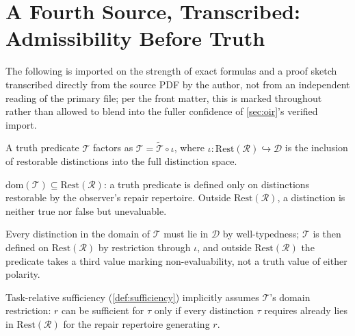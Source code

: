 \section{A Fourth Source, Transcribed: Admissibility Before Truth}
\label{sec:abt}


The following is imported on the strength of exact formulas and a proof
sketch transcribed directly from the source PDF by the author, not from
an independent reading of the primary file; per the front matter, this is
marked throughout rather than allowed to blend into the fuller confidence
of \cref{sec:oir}'s verified import.

\begin{definition}
\label{def:domain-restriction}
A truth predicate $\mathcal{T}$ factors as $\mathcal{T} = \widetilde{\mathcal{T}}
\circ \iota$, where $\iota: \mathrm{Rest}(\mathcal{R}) \hookrightarrow
\mathcal{D}$ is the inclusion of restorable distinctions into the full
distinction space.
\end{definition}

\begin{theorem}
\label{thm:domain-restriction}
$\mathrm{dom}(\mathcal{T}) \subseteq \mathrm{Rest}(\mathcal{R})$: a truth
predicate is defined only on distinctions restorable by the observer's
repair repertoire. Outside $\mathrm{Rest}(\mathcal{R})$, a distinction is
neither true nor false but unevaluable.
\end{theorem}

\begin{proofsketch}
 Every distinction in the domain
of $\mathcal{T}$ must lie in $\mathcal{D}$ by well-typedness; $\mathcal{T}$
is then defined on $\mathrm{Rest}(\mathcal{R})$ by restriction through
$\iota$, and outside $\mathrm{Rest}(\mathcal{R})$ the predicate takes a
third value marking non-evaluability, not a truth value of either
polarity.
\end{proofsketch}

\begin{proposition}
\label{prop:sufficiency-presupposes-evaluability}
Task-relative sufficiency (\cref{def:sufficiency}) implicitly assumes
$\mathcal{T}$'s domain restriction: $r$ can be sufficient for $\tau$ only
if every distinction $\tau$ requires already lies in
$\mathrm{Rest}(\mathcal{R})$ for the repair repertoire generating $r$.
\end{proposition}

